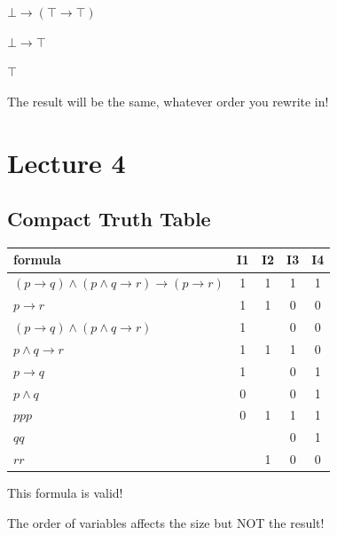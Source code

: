 \documentclass[11pt,a4paper]{article}
\begin{document}
$\bot \rightarrow (\top \rightarrow \top)$

$\bot \rightarrow \top$

$\top$

\vspace{5pt} The result will be the same, whatever order you rewrite in!

\section{Lecture 4}

\subsection{Compact Truth Table}

\begin{tabular}{l | c | c | c | c}
formula & I1 & I2 & I3 & I4\\
\hline
$(p \rightarrow q) \wedge (p \wedge q \rightarrow r) \rightarrow (p \rightarrow r)$ & 1 & 1 & 1 & 1\\
\hphantom{$(p \rightarrow q) \wedge (p \wedge q \rightarrow r) \rightarrow ($}$p \rightarrow r$ & 1 & 1 & 0 & 0\\
$(p \rightarrow q) \wedge (p \wedge q \rightarrow r)$ & 1 & & 0 & 0\\
\hphantom{$(p \rightarrow q) \wedge ($}$p \wedge q \rightarrow r$ & 1 & 1 & 1 & 0\\
\hphantom{$($}$p \rightarrow q$ & 1 & & 0 & 1\\
\hphantom{$(p \rightarrow q) \wedge ($}$p \wedge q$ & 0 & & 0 & 1\\
\hline
\hphantom{$($}$p$\hphantom{$ \rightarrow q) \wedge ($}\hspace{2pt}$p$\hphantom{$ \wedge q \rightarrow r) \rightarrow ($}\hspace{5pt}$p$ & 0 & 1 & 1 & 1\\
\hphantom{$(p \rightarrow $}$q$\hphantom{$) \wedge (p \wedge $}\hspace{8pt}$q$ & & & 0 & 1\\
\hphantom{$(p \rightarrow q) \wedge (p \wedge q \rightarrow $}$r$\hphantom{$) \rightarrow (p \rightarrow $}\hspace{8pt}$r$ & & 1 & 0 & 0
\end{tabular}

\vspace{5pt} This formula is valid!

The order of variables affects the size but NOT the result!
\end{document}
